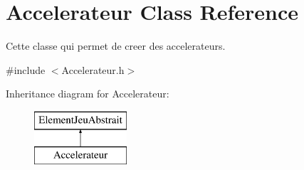 \hypertarget{class_accelerateur}{\section{Accelerateur Class Reference}
\label{class_accelerateur}
}


Cette classe qui permet de creer des accelerateurs.  




{\ttfamily \#include $<$Accelerateur.\-h$>$}

Inheritance diagram for Accelerateur\-:\begin{figure}[H]
\begin{center}
\leavevmode
\includegraphics[height=2.000000cm]{class_accelerateur}
\end{center}
\end{figure}
